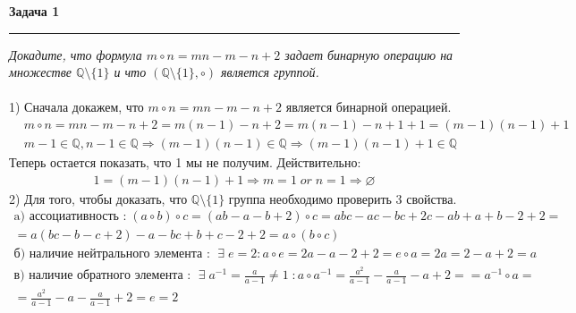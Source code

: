 \documentclass[a4paper,11pt]{article}
\begin{document}
\textbf{\large Задача 1}
\medskip\hrule\medskip
\textit{Докадите, что формула $ m \circ n = mn - m - n + 2 $ задает бинарную операцию на множестве $ \mathbb{Q} \setminus \{1\} $ и что $ (\mathbb{Q} \setminus \{1\}, \circ) $ является группой.} \\ \\
1) Сначала докажем, что $ m \circ n = mn - m - n + 2 $ является бинарной операцией.
\begin{align*}
	&m \circ n = mn - m - n + 2 = 
	m(n - 1) - n + 2 =
	m(n - 1) - n + 1 + 1 = 
	(m - 1)(n - 1) + 1 \\
	&m - 1 \in \mathbb{Q}, n - 1 \in \mathbb{Q} \Rightarrow (m - 1)(n - 1) \in \mathbb{Q} \Rightarrow	(m - 1)(n - 1) + 1 \in \mathbb{Q}
\end{align*}
Теперь остается показать, что 1 мы не получим. Действительно:
\begin{align*}
	1 = (m - 1)(n - 1) + 1 \Rightarrow m = 1 \; or \; n = 1 \Rightarrow \varnothing
\end{align*}
2) Для того, чтобы доказать, что $ \mathbb{Q} \setminus \{1\} $ группа необходимо проверить 3 свойства. 
\begin{gather*}
\text{a) ассоциативность :} \; 
(a \circ b) \circ c = (ab - a - b + 2) \circ c = abc - ac - bc + 2c - ab + a +  b - 2 + 2 =\\[2pt]
=  a(bc - b - c + 2) - a - bc + b + c - 2 + 2 = a \circ (b \circ c) \\[3pt]
\text{б) наличие нейтрального элемента : } \; \exists \; e = 2 : a \circ e = 2a - a - 2 + 2 = e \circ a = 2a = 2 - a + 2 = a  \\[3pt]
\text{в) наличие обратного элемента : } \; \exists \; a^{-1} = \frac{a}{a - 1} \neq 1  \; : a \circ a^{-1} = \frac{a^2}{a - 1} - \frac{a}{a - 1} - a + 2 =  
= a^{-1} \circ a = \\ = \frac{a^2}{a - 1} - a - \frac{a}{a - 1} + 2 = e = 2
\end{gather*}
\\ \\ \\ 

\end{document}
